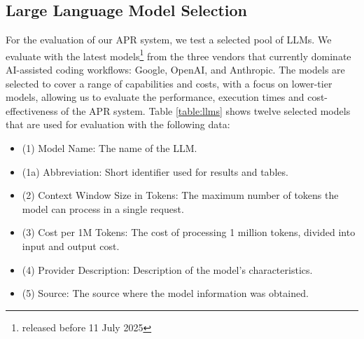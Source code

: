 \subsection{Large Language Model Selection} \label{subsection:llm-selection}
For the evaluation of our APR system, we test a selected pool of \acp{LLM}. We evaluate with the latest models\footnote{released before 11 July 2025} from the three vendors that currently dominate AI-assisted coding workflows: Google, OpenAI, and Anthropic. %
The models are selected to cover a range of capabilities and costs, with a focus on lower-tier models, allowing us to evaluate the performance, execution times and cost-effectiveness of the APR system. Table \ref{table:llms} shows twelve selected models that are used for evaluation with the following data:
\begin{itemize}
    \item (1) Model Name: The name of the \ac{LLM}.
    \item (1a) Abbreviation: Short identifier used for results and tables.
    \item (2) Context Window Size in Tokens: The maximum number of tokens the model can process in a single request.
    \item (3) Cost per 1M Tokens: The cost of processing 1 million tokens, divided into input and output cost.
    \item (4) Provider Description: Description of the model's characteristics.
    \item (5) Source: The source where the model information was obtained.
\end{itemize}

